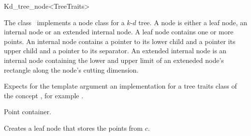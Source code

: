 

\begin{ccRefClass}{Kd_tree_node<TreeTraits>}  %


\ccDefinition
  
The class \ccRefName\ implements a node class for a $k$-$d$ tree. 
A node is either a leaf node, an internal node or an extended internal node.
A leaf node contains one or more points. An internal node contains a pointer
to its lower child and a pointer its upper child and a pointer to its separator.
An extended internal node is an internal node containing the lower and 
upper limit of an exteneded node's rectangle
along the node's cutting dimension.



Expects for the template argument an implementation for a tree traits class
of the concept ,
for example .

\ccTypes


 {Point container.}

\ccCreation
{}  %

{
Creates a leaf node  that stores the points from $c$.
}


\end{ccRefClass}
